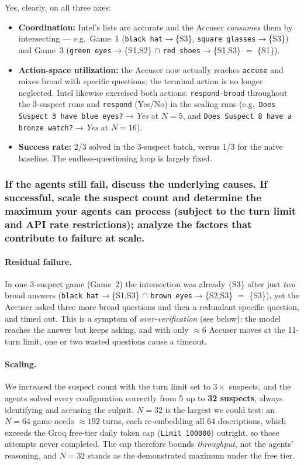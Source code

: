 \documentclass[11pt]{article}
\begin{document}
Yes, clearly, on all three axes:
\begin{itemize}[leftmargin=1.4em,itemsep=2pt]
  \item \textbf{Coordination:} Intel's lists are accurate and the Accuser \emph{consumes}
  them by intersecting --- e.g.\ Game~1 (\texttt{black hat}$\to$\{S3\},
  \texttt{square glasses}$\to$\{S3\}) and Game~3
  (\texttt{green eyes}$\to$\{S1,S2\} $\cap$ \texttt{red shoes}$\to$\{S1,S3\} $=$ \{S1\}).
  \item \textbf{Action-space utilization:} the Accuser now actually reaches
  \texttt{accuse} and mixes broad with specific questions; the terminal action is no
  longer neglected. Intel likewise exercised both actions: \texttt{respond-broad} throughout
  the 3-suspect runs and \texttt{respond} (Yes/No) in the scaling runs (e.g.\
  \texttt{Does Suspect 3 have blue eyes?}$\to$\emph{Yes} at $N{=}5$, and
  \texttt{Does Suspect 8 have a bronze watch?}$\to$\emph{Yes} at $N{=}16$).
  \item \textbf{Success rate:} 2/3 solved in the 3-suspect batch, versus 1/3 for the naive
  baseline. The endless-questioning loop is largely fixed.
\end{itemize}

\subsubsection*{If the agents still fail, discuss the underlying causes. If successful, scale
the suspect count and determine the maximum your agents can process (subject to the turn
limit and API rate restrictions); analyze the factors that contribute to failure at scale.}

\paragraph{Residual failure.} In one 3-suspect game (Game~2) the intersection was already
\{S3\} after just \emph{two} broad answers
(\texttt{black hat}$\to$\{S1,S3\} $\cap$ \texttt{brown eyes}$\to$\{S2,S3\} $=$ \{S3\}), yet
the Accuser asked three more broad questions and then a redundant specific question, and
timed out. This is a symptom of \emph{over-verification} (see below): the model reaches the
answer but keeps asking, and with only $\approx$6 Accuser moves at the 11-turn limit, one or
two wasted questions cause a timeout.

\paragraph{Scaling.} We increased the suspect count with the turn limit set to $3\times$
suspects, and the agents solved every configuration correctly from 5 up to \textbf{32
suspects}, always identifying and accusing the culprit. $N{=}32$ is the largest we could
test: an $N{=}64$ game needs $\approx192$ turns, each re-embedding all 64 descriptions, which
exceeds the Groq free-tier daily token cap (\texttt{Limit 100000}) outright, so those
attempts never completed. The cap therefore bounds \emph{throughput}, not the agents'
reasoning, and $N{=}32$ stands as the demonstrated maximum under the free tier.
\end{document}
